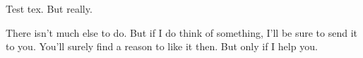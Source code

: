\documentclass[aps, preprint, groupedaddress]{revtex4}
\begin{document}
Test tex. But really.

There isn't much else to do. But if I do think of something, I'll be sure to send it to you.  You'll surely find a reason to like it then. But only if I help you.
\end{document}
